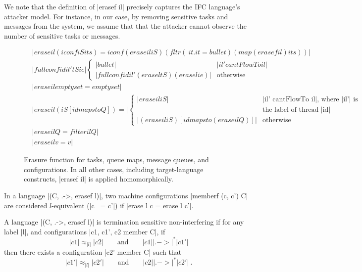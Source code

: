 We note that the definition of |erasef il| precisely captures the IFC
language's attacker model.  For instance, in our case, by removing sensitive
tasks and messages from the system, we assume that that the attacker cannot
observe the number of sensitive tasks or messages.
%

\begin{figure} %
\begin{align*}
  &|erase il (iconf iS its) =
  iconf (erase il iS) (fltr (\ it . it = bullet) (map (erasef il) its))|\\
  &|fullconf id il' tS ie| \begin{cases}
    |bullet| & |il' cantFlowTo il| \\
    |fullconf id il' (erase l tS) (erase l ie)| & \text{otherwise}
  \end{cases} \\
  &|erase il emptyset = emptyset|\\
  &|erase il (iS [id mapsto Q]) =| \begin{cases}
    |erase il iS| & \text{|il' cantFlowTo il|, where |il'| is}\\
    & \text{the label of thread |id|} \\
    |(erase il iS) [id mapsto (erase il Q)]| & \text{otherwise}
  \end{cases} \\
  &|erase il Q = filter il Q|\\
  &|erase il v = v|
\end{align*}
\caption{
Erasure function for tasks, queue maps, message queues, and configurations.
In all other cases, including target-language constructs, |erasef il| is
applied homomorphically.
\label{fig:erasure}
}
\end{figure}


\begin{definition}[$l$-equivalence]
    In a language |(C, .->, erasef l)|, two machine configurations
    |memberf (c, c') C| are considered $l$-equivalent (|c ~= c'|)
    if |erase l c = erase l c'|.
\end{definition}

\begin{definition}
  A language |(C, .->, erasef l)| is termination
  sensitive non-interfering if for any label |l|, and configurations
  |c1, c1', c2 member C|, if
  \begin{equation} \label{eq:tsni-lhs}
    |c1| \approx_{|l|} |c2|
    \qquad \text{and} \qquad
    |c1| |.->|^* |c1'|
  \end{equation}
  then there exists a configuration |c2' member C| such that
  \begin{equation} \label{eq:tsni-rhs}
    |c1'| \approx_{|l|} |c2'|
     \qquad \text{and} \qquad
    |c2| |.->|^* |c2'|
    \ \text{.}
  \end{equation}
\end{definition}

